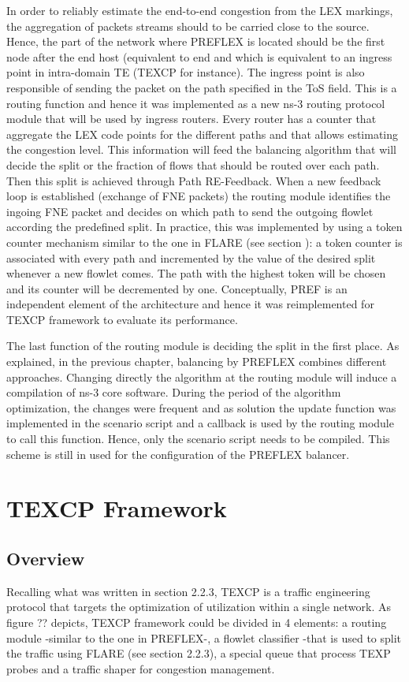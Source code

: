In order to reliably estimate the end-to-end congestion from the LEX markings, the aggregation  of  packets streams should to be carried close to the source. Hence, the part of the network where PREFLEX is located should be the first node after the end host (equivalent to end  and which is equivalent to an ingress point in intra-domain TE (TEXCP for instance).  The ingress point is also responsible of sending the packet on the path specified in the ToS field. This is a routing function and hence it was implemented as a new ns-3 routing protocol module that will be used by ingress routers. Every router has a counter that aggregate the LEX code points for the different paths and that allows estimating the congestion level. This information will feed the balancing algorithm that will decide the split or the fraction of flows that should be routed over each path. Then this split is achieved through Path RE-Feedback. When a new feedback loop is established (exchange of FNE packets) the routing module identifies the ingoing FNE packet and decides on which path to send the outgoing flowlet  according the predefined split. In practice, this was implemented by using a token counter mechanism similar to the one in FLARE (see section ): a token counter is associated with every path and incremented by the value of the desired split whenever a new flowlet comes. The path with the highest token will be chosen and its counter will be decremented by one. Conceptually, PREF is an independent element of the architecture and hence it was reimplemented for TEXCP framework to evaluate its performance.

The last function of the routing module is deciding the split in the first place. As explained, in the previous chapter, balancing by PREFLEX combines different approaches. Changing directly the algorithm at the routing module will induce a compilation of ns-3 core software. During the period of the algorithm optimization, the changes were frequent and as solution the update function was implemented in the scenario script and a callback is used by the routing module to call this function. Hence, only the scenario script needs to be compiled. This scheme is still in used for the configuration of the PREFLEX balancer.

\section{TEXCP Framework}
		\subsection{Overview}
 	Recalling what was written in section 2.2.3, TEXCP is a traffic engineering protocol that targets the optimization of utilization within a single network. As figure ?? depicts, TEXCP framework could be divided in 4 elements: a routing module -similar to the one in PREFLEX-, a flowlet classifier -that is used to split the traffic using FLARE (see section 2.2.3), a special queue that process TEXP probes and a traffic shaper for congestion management. 


